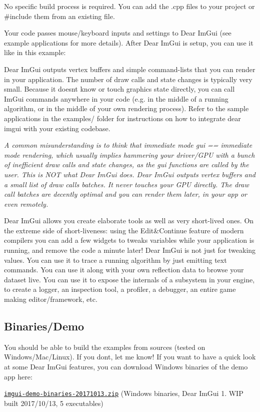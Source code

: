 No specific build process is required. You can add the .cpp files to your project or \#include them from an existing file.

Your code passes mouse/keyboard inputs and settings to Dear Im\+Gui (see example applications for more details). After Dear Im\+Gui is setup, you can use it like in this example\+:



Dear Im\+Gui outputs vertex buffers and simple command-\/lists that you can render in your application. The number of draw calls and state changes is typically very small. Because it doesn\textquotesingle{}t know or touch graphics state directly, you can call Im\+Gui commands anywhere in your code (e.\+g. in the middle of a running algorithm, or in the middle of your own rendering process). Refer to the sample applications in the examples/ folder for instructions on how to integrate dear imgui with your existing codebase.

{\itshape A common misunderstanding is to think that immediate mode gui == immediate mode rendering, which usually implies hammering your driver/\+G\+PU with a bunch of inefficient draw calls and state changes, as the gui functions are called by the user. This is N\+OT what Dear Im\+Gui does. Dear Im\+Gui outputs vertex buffers and a small list of draw calls batches. It never touches your G\+PU directly. The draw call batches are decently optimal and you can render them later, in your app or even remotely.}

Dear Im\+Gui allows you create elaborate tools as well as very short-\/lived ones. On the extreme side of short-\/liveness\+: using the Edit\&Continue feature of modern compilers you can add a few widgets to tweaks variables while your application is running, and remove the code a minute later! Dear Im\+Gui is not just for tweaking values. You can use it to trace a running algorithm by just emitting text commands. You can use it along with your own reflection data to browse your dataset live. You can use it to expose the internals of a subsystem in your engine, to create a logger, an inspection tool, a profiler, a debugger, an entire game making editor/framework, etc.

\subsection*{Binaries/\+Demo }

You should be able to build the examples from sources (tested on Windows/\+Mac/\+Linux). If you don\textquotesingle{}t, let me know! If you want to have a quick look at some Dear Im\+Gui features, you can download Windows binaries of the demo app here\+:
\begin{DoxyItemize}
\item \href{http://www.miracleworld.net/imgui/binaries/imgui-demo-binaries-20171013.zip}{\tt imgui-\/demo-\/binaries-\/20171013.\+zip} (Windows binaries, Dear Im\+Gui 1. W\+IP built 2017/10/13, 5 executables)
\end{DoxyItemize}

